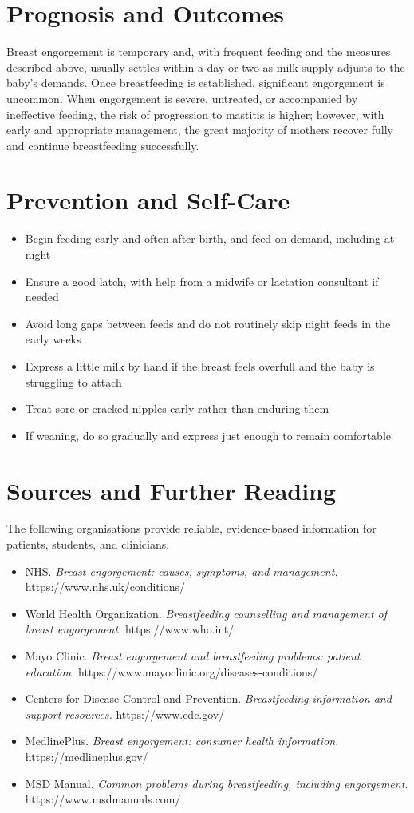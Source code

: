 \section*{Prognosis and Outcomes}
Breast engorgement is temporary and, with frequent feeding and the measures described above, usually settles within a day or two as milk supply adjusts to the baby's demands. Once breastfeeding is established, significant engorgement is uncommon. When engorgement is severe, untreated, or accompanied by ineffective feeding, the risk of progression to mastitis is higher; however, with early and appropriate management, the great majority of mothers recover fully and continue breastfeeding successfully.

\section*{Prevention and Self-Care}
\begin{itemize}
    \item Begin feeding early and often after birth, and feed on demand, including at night
    \item Ensure a good latch, with help from a midwife or lactation consultant if needed
    \item Avoid long gaps between feeds and do not routinely skip night feeds in the early weeks
    \item Express a little milk by hand if the breast feels overfull and the baby is struggling to attach
    \item Treat sore or cracked nipples early rather than enduring them
    \item If weaning, do so gradually and express just enough to remain comfortable
\end{itemize}

\section*{Sources and Further Reading}
The following organisations provide reliable, evidence-based information for patients, students, and clinicians.

\begin{itemize}
    \item NHS. \textit{Breast engorgement: causes, symptoms, and management.} https://www.nhs.uk/conditions/
    \item World Health Organization. \textit{Breastfeeding counselling and management of breast engorgement.} https://www.who.int/
    \item Mayo Clinic. \textit{Breast engorgement and breastfeeding problems: patient education.} https://www.mayoclinic.org/diseases-conditions/
    \item Centers for Disease Control and Prevention. \textit{Breastfeeding information and support resources.} https://www.cdc.gov/
    \item MedlinePlus. \textit{Breast engorgement: consumer health information.} https://medlineplus.gov/
    \item MSD Manual. \textit{Common problems during breastfeeding, including engorgement.} https://www.msdmanuals.com/
\end{itemize}
